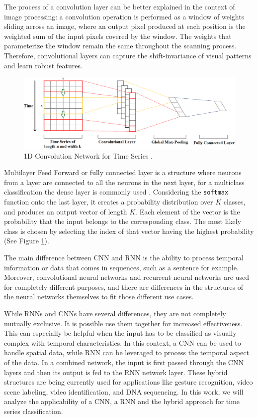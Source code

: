 The process of a convolution layer can be better explained in the context of image processing: a convolution operation is performed as a window of weights sliding across an image, where an output pixel produced at each position is the weighted sum of the input pixels covered by the window. The weights that parameterize the window remain the same throughout the scanning process. Therefore, convolutional layers can capture the shift-invariance of visual patterns and learn robust features.

\begin{figure}[htb]
	\centering
	\includegraphics[scale=0.25]{../Figures/1d-cnn}
	\caption{1D Convolution Network for Time Series \cite{Kim2014}.}
	\label{Fig:1DCNN}
\end{figure}

Multilayer Feed Forward or fully connected layer is a structure where neurons from a layer are connected to all the neurons in the next layer, for a multiclass classification the dense layer is commonly used \cite{Albawi2017}. Considering the \texttt{softmax} function onto the last layer, it creates a probability distribution over $K$ classes, and produces an output vector of length $K$. Each element of the vector is the probability that the input belongs to the corresponding class. The most likely class is chosen by selecting the index of that vector having the highest probability (See Figure \ref{Fig:1DCNN}).

The main difference between CNN and RNN is the ability to process temporal information or data that comes in sequences, such as a sentence for example. Moreover, convolutional neural networks and recurrent neural networks are used for completely different purposes, and there are differences in the structures of the neural networks themselves to fit those different use cases. 

While RNNs and CNNs have several differences, they are not completely mutually exclusive. It is possible use them together for increased effectiveness. This can especially be helpful when the input has to be classified as visually complex with temporal characteristics. In this context, a CNN can be used to handle spatial data, while RNN can be leveraged to process the temporal aspect of the data. In a combined network, the input is first passed through the CNN layers and then its output is fed to the RNN network layer. These hybrid structures are being currently used for applications like gesture recognition, video scene labeling, video identification, and DNA sequencing. In this work, we will analyze the applicability of a CNN, a RNN and the hybrid approach for time series classification.

